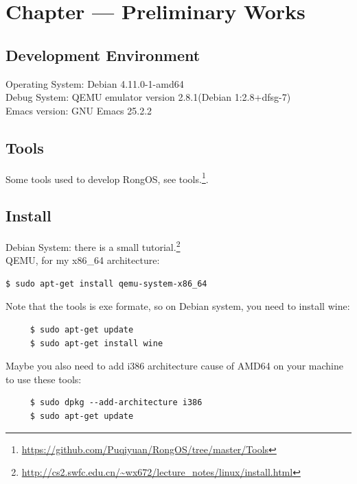 \documentclass{swfcthesis}
\begin{document}
\makepreliminarypages%
\frontmatter          
\tableofcontents     %
\listoffigures       %
\listoftables        %
\mainmatter

\chapter{Chapter --- Preliminary Works}

\section{Development Environment}
\label{sec:devel-envir}

Operating System: Debian 4.11.0-1-amd64 \\
\hspace*{0.8cm}Debug System: QEMU emulator version 2.8.1(Debian 1:2.8+dfsg-7)\\
\hspace*{0.8cm}Emacs version: GNU Emacs 25.2.2

\section{Tools}
\label{sec:tools}

Some tools used to develop RongOS, see
tools.\footnote{\url{https://github.com/Puqiyuan/RongOS/tree/master/Tools}}.

\section{Install}
\label{sec:install}

Debian System: there is a small
tutorial.\footnote{\url{http://cs2.swfc.edu.cn/~wx672/lecture_notes/linux/install.html}}\\
\hspace*{0.8cm}QEMU, for my x86\_64 architecture: 
\begin{lstlisting}[language=bash]
     $ sudo apt-get install qemu-system-x86_64
\end{lstlisting}

Note that the tools is exe formate, so on Debian system, you need to install wine:
\begin{lstlisting}
     $ sudo apt-get update
     $ sudo apt-get install wine
\end{lstlisting}

Maybe you also need to add i386 architecture cause of AMD64 on your machine to use \hspace*{0.8cm}these tools:
\begin{lstlisting}
     $ sudo dpkg --add-architecture i386
     $ sudo apt-get update
\end{lstlisting}
\end{document}
